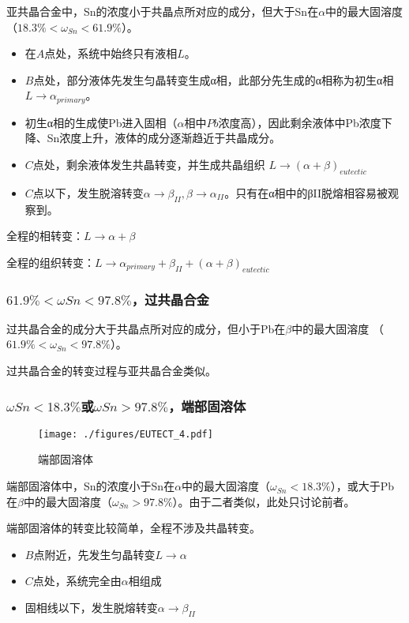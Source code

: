 亚共晶合金中，Sn的浓度小于共晶点所对应的成分，但大于Sn在$\alpha$中的最大固溶度 （$18.3\%<\omega_{Sn}<61.9\%$）。

\begin{itemize}
\item 在$A$点处，系统中始终只有液相$L$。
\item $B$点处，部分液体先发生匀晶转变生成α相，此部分先生成的α相称为初生α相$L \rightarrow \alpha_{primary}$。
\item 初生α相的生成使Pb进入固相（$\alpha$相中$Pb$浓度高），因此剩余液体中Pb浓度下降、Sn浓度上升，液体的成分逐渐趋近于共晶成分。
\item $C$点处，剩余液体发生共晶转变，并生成共晶组织 $L \rightarrow (\alpha+\beta)_{eutectic}$
\item $C$点以下，发生脱溶转变$\alpha \rightarrow \beta_{II}, \beta \rightarrow \alpha_{II}$。只有在α相中的βII脱熔相容易被观察到。
\end{itemize}

全程的相转变：$L \rightarrow \alpha+\beta$

全程的组织转变：$L \rightarrow \alpha_{primary}+\beta_{II}+(\alpha+\beta)_{eutectic}$

\subsubsection{$61.9\%<\omega Sn<97.8\%$，过共晶合金}
过共晶合金的成分大于共晶点所对应的成分，但小于Pb在$\beta$中的最大固溶度 （$61.9\%<\omega_{Sn}<97.8\%$）。

过共晶合金的转变过程与亚共晶合金类似。

\subsubsection{$\omega Sn<18.3\%$或$\omega Sn>97.8\%$，端部固溶体}
\begin{figure}[ht]
\centering
\texttt{[image: ./figures/EUTECT\_4.pdf]}
\caption{端部固溶体} \label{EUTECT_fig4}
\end{figure}
端部固溶体中，Sn的浓度小于Sn在$\alpha$中的最大固溶度（$\omega_{Sn}<18.3\%$），或大于Pb在$\beta$中的最大固溶度（$\omega_{Sn}>97.8\%$）。由于二者类似，此处只讨论前者。

端部固溶体的转变比较简单，全程不涉及共晶转变。
\begin{itemize}
\item $B$点附近，先发生匀晶转变$L \rightarrow \alpha$
\item $C$点处，系统完全由$\alpha$相组成
\item 固相线以下，发生脱熔转变$\alpha \rightarrow \beta_{II}$
\end{itemize}

